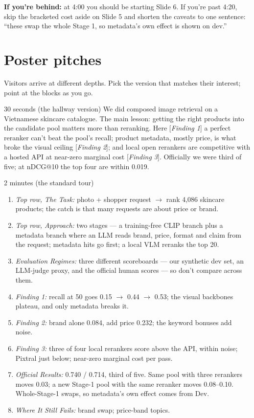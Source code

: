 \documentclass[11pt]{article}
\begin{document}
\textbf{If you're behind:} at 4:00 you should be starting Slide 6. If you're past 4:20,
skip the bracketed cost aside on Slide 5 and shorten the caveats to one sentence:
``these swap the whole Stage 1, so metadata's own effect is shown on dev.''

\section{Poster pitches}
Visitors arrive at different depths. Pick the version that matches their interest; point
at the blocks as you go.

\begin{say}{30 seconds (the hallway version)}
We did composed image retrieval on a Vietnamese skincare catalogue. The main lesson: getting
the right products into the candidate pool matters more than reranking. Here
[\emph{Finding 1}] a perfect reranker can't beat the pool's recall; product metadata,
mostly price, is what broke the visual ceiling [\emph{Finding 2}]; and local open rerankers
are competitive with a hosted API at near-zero marginal cost [\emph{Finding 3}]. Officially
we were third of five; at nDCG@10 the top four are within 0.019.
\end{say}

\begin{say}{2 minutes (the standard tour)}
\begin{enumerate}[leftmargin=*]
  \item \emph{Top row, The Task:} photo + shopper request $\to$ rank 4,086 skincare
        products; the catch is that many requests are about price or brand.
  \item \emph{Top row, Approach:} two stages --- a training-free CLIP branch plus a metadata branch
        where an LLM reads brand, price, format and claim from the request; metadata hits go
        first; a local VLM reranks the top 20.
  \item \emph{Evaluation Regimes:} three different scoreboards --- our synthetic dev set, an LLM-judge
        proxy, and the official human scores --- so don't compare across them.
  \item \emph{Finding 1:} recall at 50 goes 0.15 $\to$ 0.44 $\to$ 0.53; the visual
        backbones plateau, and only metadata breaks it.
  \item \emph{Finding 2:} brand alone 0.084, add price 0.232; the keyword bonuses add noise.
  \item \emph{Finding 3:} three of four local rerankers score above the API, within noise;
        Pixtral just below; near-zero marginal cost per pass.
  \item \emph{Official Results:} 0.740 / 0.714, third of five. Same pool with three rerankers
        moves 0.03; a new Stage-1 pool with the same reranker moves 0.08--0.10. Whole-Stage-1
        swaps, so metadata's own effect comes from Dev.
  \item \emph{Where It Still Fails:} brand swap; price-band topics.
\end{enumerate}
\end{say}
\end{document}

